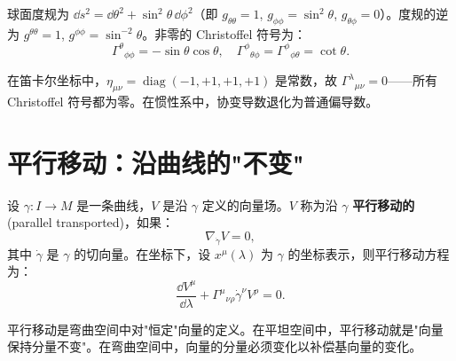 球面度规为 $\dd s^2 = \dd\theta^2 + \sin^2\theta \, \dd\phi^2$（即 $g_{\theta\theta} = 1$, $g_{\phi\phi} = \sin^2\theta$, $g_{\theta\phi} = 0$）。度规的逆为 $g^{\theta\theta}=1$, $g^{\phi\phi}=\sin^{-2}\theta$。非零的 Christoffel 符号为：
\begin{equation}
    \Gamma^\theta{}_{\phi\phi} = -\sin\theta\cos\theta, \quad
    \Gamma^\phi{}_{\theta\phi} = \Gamma^\phi{}_{\phi\theta} = \cot\theta.
\end{equation}

在笛卡尔坐标中，$\eta_{\mu\nu} = \operatorname{diag}(-1,+1,+1,+1)$ 是常数，故 $\Gamma^\lambda{}_{\mu\nu} = 0$——所有 Christoffel 符号都为零。在惯性系中，协变导数退化为普通偏导数。

\section{平行移动：沿曲线的"不变"}

\begin{definition}[平行移动]
设 $\gamma: I \to M$ 是一条曲线，$V$ 是沿 $\gamma$ 定义的向量场。$V$ 称为沿 $\gamma$ \textbf{平行移动的} (parallel transported)，如果：
\begin{equation}
    \nabla_{\dot\gamma} V = 0,
\end{equation}
其中 $\dot\gamma$ 是 $\gamma$ 的切向量。在坐标下，设 $x^\mu(\lambda)$ 为 $\gamma$ 的坐标表示，则平行移动方程为：
\begin{equation}
    \frac{\dd V^\mu}{\dd\lambda} + \Gamma^\mu{}_{\nu\rho} \dot\gamma^\nu V^\rho = 0.
\end{equation}
\end{definition}

平行移动是弯曲空间中对"恒定"向量的定义。在平坦空间中，平行移动就是"向量保持分量不变"。在弯曲空间中，向量的分量必须变化以补偿基向量的变化。

